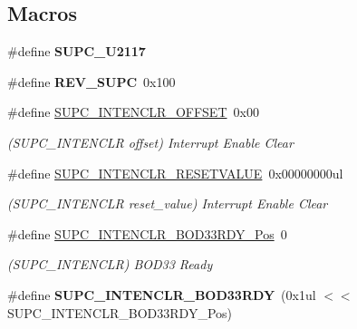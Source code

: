 \subsection*{Macros}
\begin{DoxyCompactItemize}
\item 
\hypertarget{group___s_a_m_l21___s_u_p_c_ga3cd2bfe83dabe45955c5b58a67d77965}{}\#define {\bfseries S\+U\+P\+C\+\_\+\+U2117}\label{group___s_a_m_l21___s_u_p_c_ga3cd2bfe83dabe45955c5b58a67d77965}

\item 
\hypertarget{group___s_a_m_l21___s_u_p_c_gaea0564089f160af52b58fe11aea0a7e4}{}\#define {\bfseries R\+E\+V\+\_\+\+S\+U\+P\+C}~0x100\label{group___s_a_m_l21___s_u_p_c_gaea0564089f160af52b58fe11aea0a7e4}

\item 
\hypertarget{group___s_a_m_l21___s_u_p_c_ga862c0a414e75785fcadd029c283721b9}{}\#define \hyperlink{group___s_a_m_l21___s_u_p_c_ga862c0a414e75785fcadd029c283721b9}{S\+U\+P\+C\+\_\+\+I\+N\+T\+E\+N\+C\+L\+R\+\_\+\+O\+F\+F\+S\+E\+T}~0x00\label{group___s_a_m_l21___s_u_p_c_ga862c0a414e75785fcadd029c283721b9}

\begin{DoxyCompactList}\small\item\em (S\+U\+P\+C\+\_\+\+I\+N\+T\+E\+N\+C\+L\+R offset) Interrupt Enable Clear \end{DoxyCompactList}\item 
\hypertarget{group___s_a_m_l21___s_u_p_c_gab643753c16be95790e1c97f36a2d00f2}{}\#define \hyperlink{group___s_a_m_l21___s_u_p_c_gab643753c16be95790e1c97f36a2d00f2}{S\+U\+P\+C\+\_\+\+I\+N\+T\+E\+N\+C\+L\+R\+\_\+\+R\+E\+S\+E\+T\+V\+A\+L\+U\+E}~0x00000000ul\label{group___s_a_m_l21___s_u_p_c_gab643753c16be95790e1c97f36a2d00f2}

\begin{DoxyCompactList}\small\item\em (S\+U\+P\+C\+\_\+\+I\+N\+T\+E\+N\+C\+L\+R reset\+\_\+value) Interrupt Enable Clear \end{DoxyCompactList}\item 
\hypertarget{group___s_a_m_l21___s_u_p_c_ga954d19abdcfd11670af385240501a3f9}{}\#define \hyperlink{group___s_a_m_l21___s_u_p_c_ga954d19abdcfd11670af385240501a3f9}{S\+U\+P\+C\+\_\+\+I\+N\+T\+E\+N\+C\+L\+R\+\_\+\+B\+O\+D33\+R\+D\+Y\+\_\+\+Pos}~0\label{group___s_a_m_l21___s_u_p_c_ga954d19abdcfd11670af385240501a3f9}

\begin{DoxyCompactList}\small\item\em (S\+U\+P\+C\+\_\+\+I\+N\+T\+E\+N\+C\+L\+R) B\+O\+D33 Ready \end{DoxyCompactList}\item 
\hypertarget{group___s_a_m_l21___s_u_p_c_ga3b8d4b2d67e301bfafdc1654f2b2b4b1}{}\#define {\bfseries S\+U\+P\+C\+\_\+\+I\+N\+T\+E\+N\+C\+L\+R\+\_\+\+B\+O\+D33\+R\+D\+Y}~(0x1ul $<$$<$ S\+U\+P\+C\+\_\+\+I\+N\+T\+E\+N\+C\+L\+R\+\_\+\+B\+O\+D33\+R\+D\+Y\+\_\+\+Pos)\label{group___s_a_m_l21___s_u_p_c_ga3b8d4b2d67e301bfafdc1654f2b2b4b1}


\end{DoxyCompactItemize}
